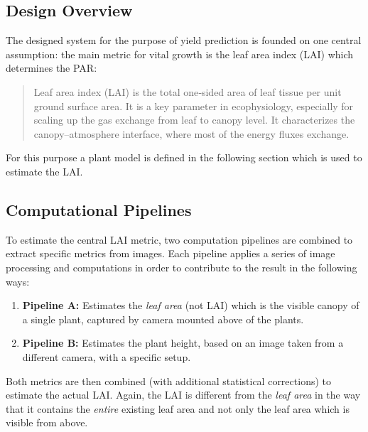 \graphicspath{{members/ssr/figures/modelling}}

\subsection{Design Overview}


The designed system for the purpose of yield prediction is founded on one central assumption: 
the main metric for vital growth is the leaf area index (LAI) which determines the PAR:

\begin{quote}
    \centering
    Leaf area index (LAI) is the total one‐sided area of leaf tissue per unit ground surface area.
    It is a key parameter in ecophysiology, especially for scaling up the gas exchange from leaf
    to canopy level.
    It characterizes the canopy–atmosphere interface, where most of the energy fluxes exchange. \cite{beda:nathalie}
\end{quote}

For this purpose a plant model is defined in the following section which is used to estimate
the LAI.



\subsection{Computational Pipelines}


To estimate the central LAI metric, two computation pipelines are combined to extract specific metrics from images.
Each pipeline applies a series of image processing and computations in order to contribute to the result
in the following ways:

\begin{enumerate}
    \item \textbf{Pipeline A:} Estimates the \textit{leaf area} (not LAI) which is the visible canopy
    of a single plant, captured by camera mounted above of the plants.
    \item \textbf{Pipeline B:} Estimates the plant height, based on an image taken from a different camera,
    with a specific setup.
\end{enumerate}

Both metrics are then combined (with additional statistical corrections) to estimate the actual LAI.
Again, the LAI is different from the \textit{leaf area} in the way that it contains
the \textit{entire} existing leaf area and not only the leaf area which is visible from above.

